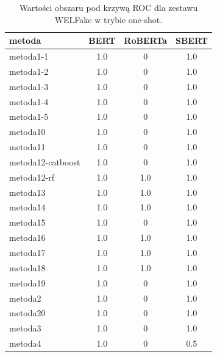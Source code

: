 \begin{table}[H]
	\centering
	\caption{Wartości obszaru pod krzywą ROC dla zestawu WELFake w trybie one-shot.}
	\label{tab:roc_auc_one_shot_welfake}
	\small
	\begin{tabular}{lccc}
		\toprule
		\textbf{metoda}   & \textbf{BERT} & \textbf{RoBERTa} & \textbf{SBERT} \\
		\midrule
		metoda1-1         & 1.0           &   0              & 1.0            \\
		metoda1-2         & 1.0           &   0              & 1.0            \\
		metoda1-3         & 1.0           &   0              & 1.0            \\
		metoda1-4         & 1.0           &   0              & 1.0            \\
		metoda1-5         & 1.0           &   0              & 1.0            \\
		metoda10          & 1.0           &   0              & 1.0            \\
		metoda11          & 1.0           &   0              & 1.0            \\
		metoda12-catboost & 1.0           &   0              & 1.0            \\
		metoda12-rf       & 1.0           & 1.0              & 1.0            \\
		metoda13          & 1.0           & 1.0              & 1.0            \\
		metoda14          & 1.0           & 1.0              & 1.0            \\
		metoda15          & 1.0           &   0              & 1.0            \\
		metoda16          & 1.0           & 1.0              & 1.0            \\
		metoda17          & 1.0           & 1.0              & 1.0            \\
		metoda18          & 1.0           & 1.0              & 1.0            \\
		metoda19          & 1.0           &   0              & 1.0            \\
		metoda2           & 1.0           &   0              & 1.0            \\
		metoda20          & 1.0           &   0              & 1.0            \\
		metoda3           & 1.0           &   0              & 1.0            \\
		metoda4           & 1.0           &   0              & 0.5            \\

\end{tabular}
\end{table}
